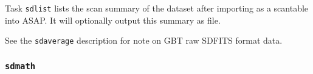 Task {\tt sdlist} lists the scan summary of the dataset after importing
as a scantable into ASAP.  It will optionally output this summary
as file.
    

See the {\tt sdaverage} description for note on GBT raw SDFITS format data.

\subsubsection{{\tt sdmath}}
\label{section:sd.sdtasks.tasks.sdmath}

